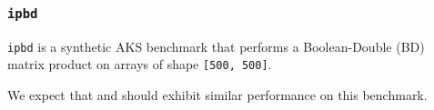 \subsubsection{\tt ipbd}
\label{benchmarkipbd}

{\tt ipbd} is a synthetic AKS benchmark that performs
a Boolean-Double ({\apl B\qplus\qdot\qtimes\qtran\0D}) matrix product on 
arrays of shape {\tt [500, 500]}.

We expect that \wlf and \awlf should exhibit similar performance
on this benchmark.

